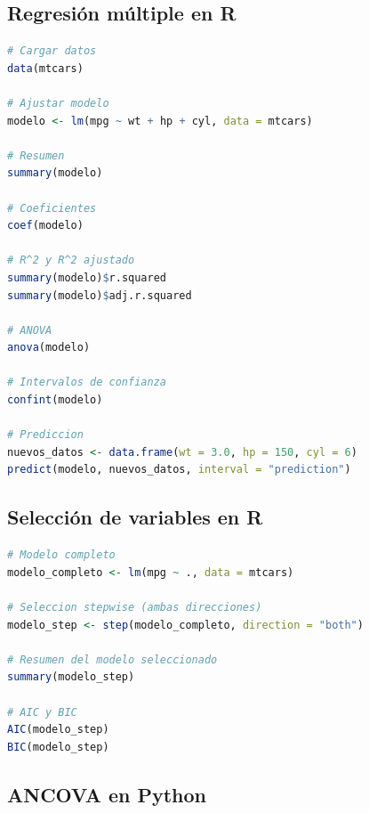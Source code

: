 \documentclass[11pt,a4paper]{article}
\begin{document}
\subsection{Regresión múltiple en R}

\begin{lstlisting}[language=R, caption=Regresión múltiple en R]
# Cargar datos
data(mtcars)

# Ajustar modelo
modelo <- lm(mpg ~ wt + hp + cyl, data = mtcars)

# Resumen
summary(modelo)

# Coeficientes
coef(modelo)

# R^2 y R^2 ajustado
summary(modelo)$r.squared
summary(modelo)$adj.r.squared

# ANOVA
anova(modelo)

# Intervalos de confianza
confint(modelo)

# Prediccion
nuevos_datos <- data.frame(wt = 3.0, hp = 150, cyl = 6)
predict(modelo, nuevos_datos, interval = "prediction")
\end{lstlisting}

\subsection{Selección de variables en R}

\begin{lstlisting}[language=R, caption=Selección stepwise]
# Modelo completo
modelo_completo <- lm(mpg ~ ., data = mtcars)

# Seleccion stepwise (ambas direcciones)
modelo_step <- step(modelo_completo, direction = "both")

# Resumen del modelo seleccionado
summary(modelo_step)

# AIC y BIC
AIC(modelo_step)
BIC(modelo_step)
\end{lstlisting}

\subsection{ANCOVA en Python}
\end{document}
